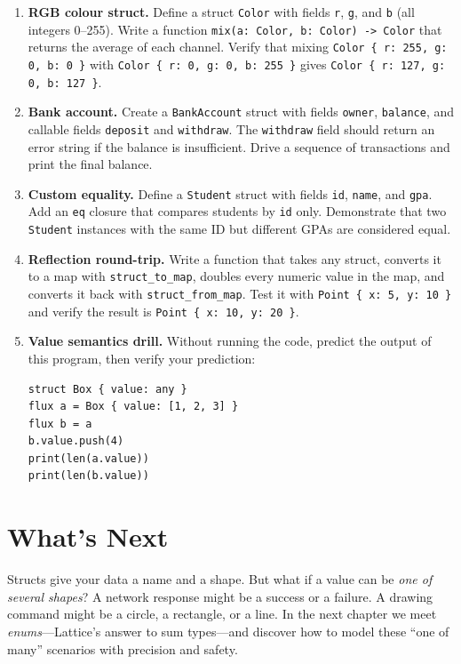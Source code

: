 \begin{enumerate}
  \item \textbf{RGB colour struct.}
    Define a struct \lstinline|Color| with fields \lstinline|r|,
    \lstinline|g|, and \lstinline|b| (all integers 0--255). Write a
    function \lstinline|mix(a: Color, b: Color) -> Color| that returns
    the average of each channel. Verify that mixing
    \lstinline|Color { r: 255, g: 0, b: 0 }| with
    \lstinline|Color { r: 0, g: 0, b: 255 }| gives
    \lstinline|Color { r: 127, g: 0, b: 127 }|.

  \item \textbf{Bank account.}
    Create a \lstinline|BankAccount| struct with fields \lstinline|owner|,
    \lstinline|balance|, and callable fields \lstinline|deposit| and
    \lstinline|withdraw|. The \lstinline|withdraw| field should return
    an error string if the balance is insufficient. Drive a sequence of
    transactions and print the final balance.

  \item \textbf{Custom equality.}
    Define a \lstinline|Student| struct with fields \lstinline|id|,
    \lstinline|name|, and \lstinline|gpa|. Add an \lstinline|eq| closure
    that compares students by \lstinline|id| only. Demonstrate that two
    \lstinline|Student| instances with the same ID but different GPAs are
    considered equal.

  \item \textbf{Reflection round-trip.}
    Write a function that takes any struct, converts it to a map with
    \lstinline|struct_to_map|, doubles every numeric value in the map,
    and converts it back with \lstinline|struct_from_map|. Test it with
    \lstinline|Point { x: 5, y: 10 }| and verify the result is
    \lstinline|Point { x: 10, y: 20 }|.

  \item \textbf{Value semantics drill.}
    Without running the code, predict the output of this program, then
    verify your prediction:
    \begin{lstlisting}[language=Lattice]
struct Box { value: any }
flux a = Box { value: [1, 2, 3] }
flux b = a
b.value.push(4)
print(len(a.value))
print(len(b.value))
    \end{lstlisting}
\end{enumerate}

\section*{What's Next}

Structs give your data a name and a shape. But what if a value can be
\emph{one of several shapes}? A network response might be a success or
a failure. A drawing command might be a circle, a rectangle, or a line.
In the next chapter we meet \emph{enums}---Lattice's answer to
sum types---and discover how to model these ``one of many'' scenarios
with precision and safety.
